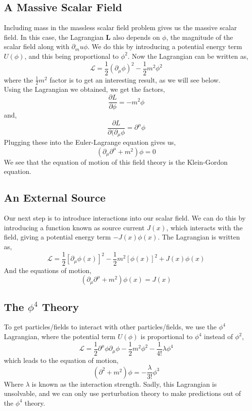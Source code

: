 \subsection{A Massive Scalar Field}
Including mass in the massless scalar field problem gives us the massive scalar field. In this case, the Lagrangian $\textbf{L}$
also depends on $\phi$, the magnitude of the scalar field along with $\partial_mu\phi$. We do this by introducing a potential energy term $U(\phi)$, and this being proportional to $\phi^2$. Now the Lagrangian can be written as,
\begin{equation}
    \mathcal{L}=\frac{1}{2}(\partial_\mu\phi)^2-\frac{1}{2}m^2\phi^2
\end{equation}
where the $\frac{1}{2}m^2$ factor is to get an interesting result, as we will see below.\\
Using the Lagrangian we obtained, we get the factors,
\begin{equation}
    \frac{\partial L}{\partial\phi}=-m^2\phi
\end{equation}
and,
\begin{equation}
    \frac{\partial L}{\partial(\partial_\mu\phi}=\partial^\mu\phi
\end{equation}
Plugging these into the Euler-Lagrange equation gives us,
\begin{equation}
    (\partial_\mu\partial^\mu+m^2)\phi=0
\end{equation}
We see that the equation of motion of this field theory is the Klein-Gordon equation.
\subsection{An External Source}
Our next step is to introduce interactions into our scalar field. We can do this by introducing a function known as source current $J(x)$, which interacts with the field, giving a potential energy term $-J(x)\phi(x)$. The Lagrangian is written as,
\begin{equation}
    \mathcal{L}=\frac{1}{2}[\partial_\mu\phi(x)]^2-\frac{1}{2}m^2[\phi(x)]^2+J(x)\phi(x)
\end{equation}
And the equations of motion,
\begin{equation}
     (\partial_\mu\partial^\mu+m^2)\phi(x)=J(x)
\end{equation}
\subsection{The $\phi^{4}$ Theory}
To get particles/fields to interact with other particles/fields, we use the $\phi^4$ Lagrangian, where the potential term $U(\phi)$ is proportional to $\phi^4$ instead of $\phi^2$,
\begin{equation}
    \mathcal{L}=\frac{1}{2}\partial^\mu\phi\partial_\mu\phi-\frac{1}{2}m^2\phi^2-\frac{1}{4!}\lambda\phi^4
\end{equation}
which leads to the equation of motion,
\begin{equation}
    (\partial^2+m^2)\phi=-\frac{\lambda}{3!}\phi^3
\end{equation}
Where $\lambda$ is known as the interaction strength. Sadly, this Lagrangian is unsolvable, and we can only use perturbation theory to make predictions out of the $\phi^4$ theory.

